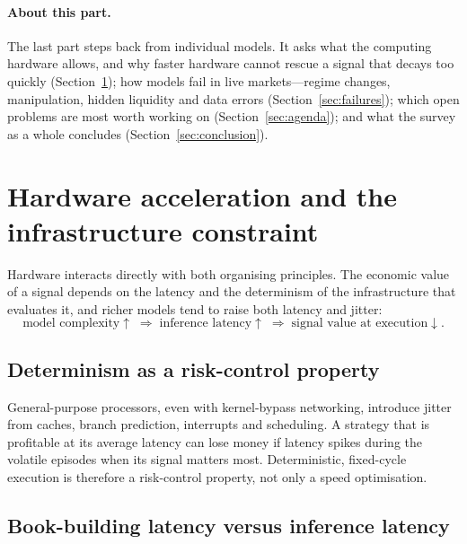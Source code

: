 \paragraph{About this part.} The last part steps back from individual models. It asks what the
computing hardware allows, and why faster hardware cannot rescue a signal that decays too quickly
(Section~\ref{sec:hardware}); how models fail in live markets---regime changes, manipulation, hidden
liquidity and data errors (Section~\ref{sec:failures}); which open problems are most worth working on
(Section~\ref{sec:agenda}); and what the survey as a whole concludes (Section~\ref{sec:conclusion}).

\section{Hardware acceleration and the infrastructure constraint}
\label{sec:hardware}

Hardware interacts directly with both organising principles. The economic value of a signal
depends on the latency and the determinism of the infrastructure that evaluates it, and richer
models tend to raise both latency and jitter:
\begin{equation}
  \text{model complexity} \uparrow \;\Rightarrow\; \text{inference latency} \uparrow \;\Rightarrow\;
  \text{signal value at execution} \downarrow .
\end{equation}

\subsection{Determinism as a risk-control property}

General-purpose processors, even with kernel-bypass networking, introduce jitter from caches,
branch prediction, interrupts and scheduling. A strategy that is profitable at its average latency
can lose money if latency spikes during the volatile episodes when its signal matters most.
Deterministic, fixed-cycle execution is therefore a risk-control property, not only a speed
optimisation.

\subsection{Book-building latency versus inference latency}

